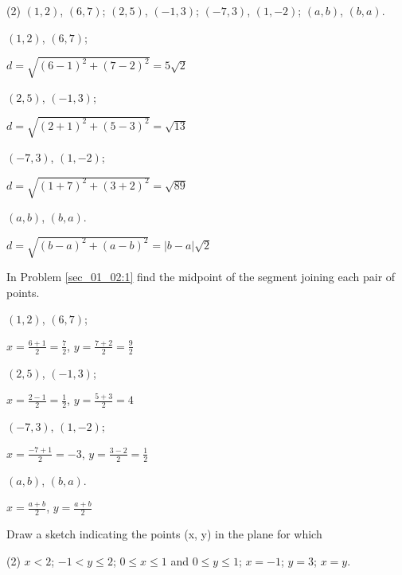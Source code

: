 \begin{questions}
  \begin{tasks}(2)
    \task $(1,2)$, $(6,7)$;
    \task $(2,5)$, $(-1,3)$;
    \task $(-7, 3)$, $(1, -2)$;
    \task $(a, b)$, $(b, a)$.
  \end{tasks}
  \begin{tasks}
    \task $(1,2)$, $(6,7)$;
    \begin{solution}
      $d=\sqrt{(6-1)^2+(7-2)^2}=5\sqrt{2}$
    \end{solution}
    \task $(2,5)$, $(-1,3)$;
    \begin{solution}
      $d=\sqrt{(2+1)^2+(5-3)^2}=\sqrt{13}$
    \end{solution}
    \task $(-7, 3)$, $(1, -2)$;
    \begin{solution}
      $d=\sqrt{(1+7)^2+(3+2)^2}=\sqrt{89}$
    \end{solution}
    \task $(a, b)$, $(b, a)$.
    \begin{solution}
      $d=\sqrt{(b-a)^2+(a-b)^2}=\left| b-a \right| \sqrt{2}$
    \end{solution}
  \end{tasks}

  \item In Problem \ref{sec_01_02:1} find the midpoint of the segment joining each pair of points.

  \begin{tasks}
    \task $(1,2)$, $(6,7)$;
    \begin{solution}
      \(x=\frac{6+1}{2} = \frac{7}{2}\), \(y=\frac{7+2}{2}=\frac{9}{2}\)
    \end{solution}
    \task $(2,5)$, $(-1,3)$;
    \begin{solution}
      \(x=\frac{2-1}{2}=\frac{1}{2}\), \(y=\frac{5+3}{2}=4\)
    \end{solution}
    \task $(-7, 3)$, $(1, -2)$;
    \begin{solution}
      \(x=\frac{-7+1}{2}=-3\), \(y=\frac{3-2}{2}=\frac{1}{2}\)
    \end{solution}
    \task $(a, b)$, $(b, a)$.
    \begin{solution}
      \(x=\frac{a+b}{2}\), \(y=\frac{a+b}{2}\)
    \end{solution}
  \end{tasks}

  \item Draw a sketch indicating the points (x, y) in the plane for which
  \begin{tasks}(2)
    \task $x<2$;
    \task $-1<y \leq 2$;
    \task $0 \leq x \leq 1$ and $0 \leq y \leq 1$;
    \task $x=-1$;
    \task $y=3$;
    \task $x=y$.
  \end{tasks}


\end{questions}
